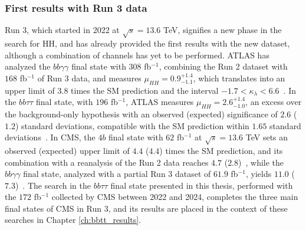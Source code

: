 \subsubsection{First results with Run 3 data}
%
Run 3, which started in 2022 at $\sqrt{s}=13.6$ TeV, signifies a new phase in the search for HH, and has already provided the first results with the new dataset, although a combination of channels has yet to be performed. ATLAS has analyzed the $bb\gamma\gamma$ final state with $308$ fb$^{-1}$, combining the Run 2 dataset with $168$ fb$^{-1}$ of Run 3 data, and measures $\mu_{HH} = 0.9^{+1.4}_{-1.1}$, which translates into an upper limit of $3.8$ times the SM prediction and the interval $-1.7 < \kappa_\lambda < 6.6$~\cite{ATLAS:2025hhd}. In the $bb\tau\tau$ final state, with $196$ fb$^{-1}$, ATLAS measures $\mu_{HH} = 2.6^{+1.4}_{-1.0}$, an excess over the background-only hypothesis with an observed (expected) significance of $2.6$ ($1.2$) standard deviations, compatible with the SM prediction within $1.65$ standard deviations~\cite{ATLAS-HH-bbtautau-Run3}. In CMS, the $4b$ final state with $62$ fb$^{-1}$ at $\sqrt{s}=13.6$ TeV sets an observed (expected) upper limit of $4.4$ ($4.4$) times the SM prediction, and its combination with a reanalysis of the Run 2 data reaches $4.7$ ($2.8$)~\cite{CMS:2026znu}, while the $bb\gamma\gamma$ final state, analyzed with a partial Run 3 dataset of $61.9$ fb$^{-1}$, yields $11.0$ ($7.3$)~\cite{CMS-PAS-HIG-25-007}. The search in the $bb\tau\tau$ final state presented in this thesis, performed with the $172$ fb$^{-1}$ collected by CMS between 2022 and 2024, completes the three main final states of CMS in Run 3, and its results are placed in the context of these searches in Chapter \ref{ch:bbtt_results}.

